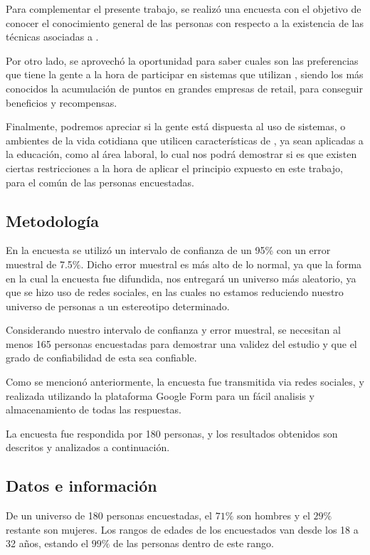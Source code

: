 Para complementar el presente trabajo, se realizó una encuesta con el objetivo de
conocer el conocimiento general de las personas con respecto a la existencia
de las técnicas asociadas a {\GAM}.

Por otro lado, se aprovechó la oportunidad para saber cuales son las preferencias
que tiene la gente a la hora de participar en sistemas que utilizan {\GAM},
siendo los más conocidos la acumulación de puntos en grandes empresas de retail,
para conseguir beneficios y recompensas.

Finalmente, podremos apreciar si la gente está dispuesta al uso de sistemas,
o ambientes de la vida cotidiana que utilicen características de {\GAM},
ya sean aplicadas a la educación, como al área laboral, lo cual nos podrá
demostrar si es que existen ciertas restricciones a la hora de aplicar
el principio expuesto en este trabajo, para el común de las personas
encuestadas.

\subsection{Metodología}

En la encuesta se utilizó un intervalo de confianza de un 95\% con un error
muestral de 7.5\%. Dicho error muestral es más alto de lo normal, ya que la forma 
en la cual la encuesta fue difundida, nos entregará un universo más aleatorio,
 ya que se hizo uso de redes sociales, en las cuales no estamos reduciendo nuestro
 universo de personas a un estereotipo determinado.

Considerando nuestro intervalo de confianza y error muestral, se necesitan al menos 165 
personas encuestadas para demostrar una validez del estudio y que el grado de confiabilidad 
de esta sea confiable.

Como se mencionó anteriormente, la encuesta fue transmitida via redes sociales,
y realizada utilizando la plataforma Google Form para un fácil analisis y almacenamiento
 de todas las respuestas.

La encuesta fue respondida por 180 personas, y los resultados obtenidos son descritos y 
analizados a continuación.

\subsection{Datos e información}

De un universo de 180 personas encuestadas, el $71\%$ son hombres y el $29\%$ restante son mujeres. 
Los rangos de edades de los encuestados van desde los 18 a 32 años, estando el $99\%$ de las personas
dentro de este rango.

